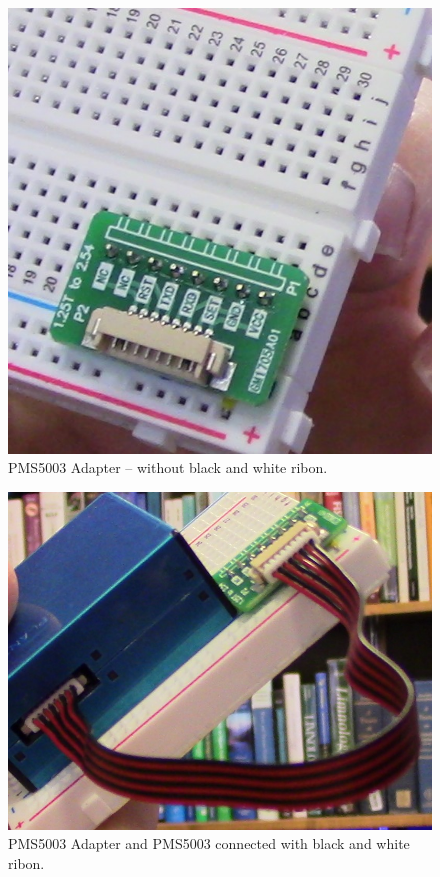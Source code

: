 \documentclass{article}
\begin{document}
\begin{enumerate}
\begin{figure}
\includegraphics[width=1.00\textwidth]{images/2_AdapterBreadboard.JPG}
\caption{PMS5003 Adapter -- without black and white ribon.}
\label{fig:Breadborad-VCC-GND}
\end{figure}

\begin{figure}
\includegraphics[width=1.00\textwidth]{images/2_PMS5003_Adaper_Cable.JPG}
\caption{PMS5003 Adapter and PMS5003 connected with black and white ribon.}
\label{fig:Breadborad-VCC-GND}
\end{figure}


\end{enumerate}
\end{document}
